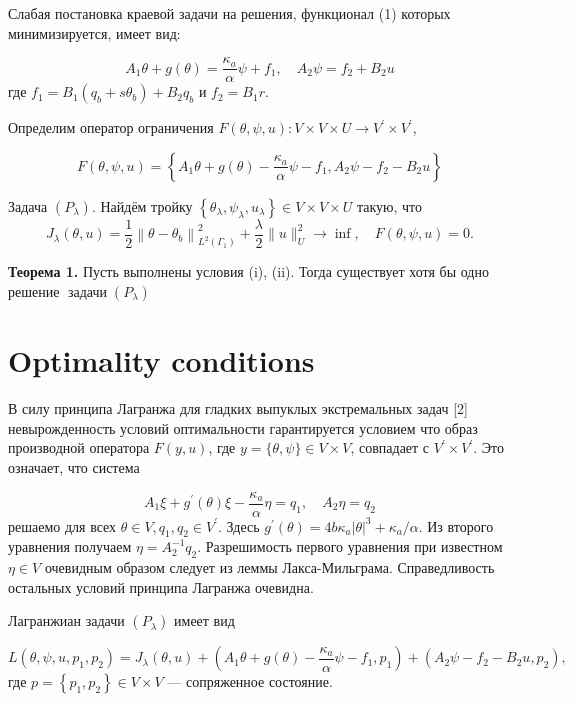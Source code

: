 \documentclass[10pt]{article}
\begin{document}
Слабая постановка краевой задачи на
решения, функционал (1) которых минимизируется, имеет вид:

\[
A_{1} \theta+g(\theta)=\frac{\kappa_{a}}{\alpha} \psi+f_{1}, \quad A_{2} \psi=f_{2}+B_{2} u
\]
где $f_{1}=B_{1}\left(q_{b}+s \theta_{b}\right)+B_{2} q_{b}$ и $f_{2}=B_{1} r$.

Определим оператор ограничения $F(\theta, \psi, u): V \times V \times U \rightarrow V^{\prime} \times V^{\prime}$,

\[
F(\theta, \psi, u)=\left\{A_{1} \theta+g(\theta)
- \frac{\kappa_{a}}{\alpha} \psi-f_{1}, A_{2} \psi-f_{2}-B_{2} u\right\}
\]

Задача $\left(P_{\lambda}\right)$.
Найдём тройку $\left\{\theta_{\lambda}, \psi_{\lambda}, u_{\lambda}\right\} \in V \times V \times U$
такую, что
\[
J_{\lambda}(\theta, u)=\frac{1}{2}\left\|\theta-\theta_{b}\right\|_{L^{2}\left(\Gamma_{1}\right)}^{2}
+ \frac{\lambda}{2}\|u\|_{U}^{2} \rightarrow \inf , \quad F(\theta, \psi, u)=0.
\]

\textbf{Теорема 1.}
Пусть выполнены условия (i), (ii).
 Тогда существует хотя бы одно решение $\operatorname{задачи}\left(P_{\lambda}\right)$

\section{Optimality conditions}
В силу принципа Лагранжа для гладких выпуклых экстремальных задач [2]
невырожденность условий оптимальности гарантируется условием
что образ производной оператора
$F(y, u)$, где $y=\{\theta, \psi\} \in V \times V$, совпадает с $V^{\prime} \times V^{\prime}$.
Это означает, что система


\[
A_{1} \xi+g^{\prime}(\theta) \xi-\frac{\kappa_{a}}{\alpha} \eta=q_{1}, \quad A_{2} \eta=q_{2}
\]
решаемо для всех $\theta \in V, q_{1}, q_{2} \in V^{\prime}$.
Здесь $g^{\prime}(\theta)=4b\kappa_{a}|\theta|^{3}+\kappa_{a} / \alpha$.
Из второго уравнения получаем $\eta=A_{2}^{-1} q_{2}$.
Разрешимость первого уравнения при известном $\eta \in V$ очевидным образом следует из леммы Лакса-Мильграма.
Справедливость остальных условий принципа Лагранжа очевидна.

Лагранжиан задачи $\left(P_{\lambda}\right)$ имеет вид

\[
L\left(\theta, \psi, u, p_{1}, p_{2}\right)=J_{\lambda}(\theta, u)
+ \left(A_{1} \theta+g(\theta)-\frac{\kappa_{a}}{\alpha} \psi-f_{1},
p_{1}\right)+\left(A_{2} \psi-f_{2}-B_{2} u, p_{2}\right),
\]
где $p=\left\{p_{1}, p_{2}\right\} \in V \times V$ — сопряженное состояние.
\end{document}
